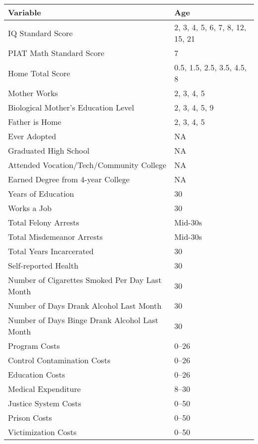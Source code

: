 \begin{tabular}{l l}
\toprule
Variable	&	Age	\\
\midrule			
IQ Standard Score	&	2, 3, 4, 5, 6, 7, 8, 12, 15, 21	\\
PIAT Math Standard Score	&	7	\\
Home Total Score	&	0.5, 1.5, 2.5, 3.5, 4.5, 8	\\
Mother Works	&	2, 3, 4, 5	\\
Biological Mother's Education Level	&	2, 3, 4, 5, 9	\\
Father is Home	&	2, 3, 4, 5	\\
Ever Adopted	&		NA \\
Graduated High School	&	NA	\\
Attended Vocation/Tech/Community College	&	NA	\\
Earned Degree from 4-year College	&	NA	\\
Years of Education	&	30	\\
Works a Job	&	30	\\
Total Felony Arrests	&	Mid-30s	\\
Total Misdemeanor Arrests	&	Mid-30s	\\
Total Years Incarcerated	&	30	\\
Self-reported Health	&	30	\\
Number of Cigarettes Smoked Per Day Last Month	&	30	\\
Number of Days Drank Alcohol Last Month	&	30	\\
Number of Days Binge Drank Alcohol Last Month	&	30	\\
Program Costs	&	0--26	\\
Control Contamination Costs	&	0--26	\\
Education Costs	&	0--26	\\
Medical Expenditure &	8--30	\\
Justice System Costs	&	0--50	\\
Prison Costs	&	0--50	\\
Victimization Costs	&	0--50	\\
\bottomrule			
\end{tabular}